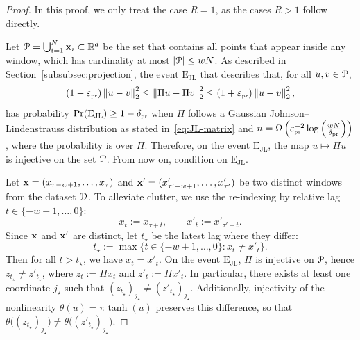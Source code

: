 \begin{proof}
    In this proof, we only treat the case $R = 1$, as the cases $R > 1$ follow directly.
    
    Let ${\mathcal{P}} = \bigcup_{i=1}^N {\mathbf{x}}_i \subset {\mathbb{R}}^d$ be the set that contains all points that appear inside any window, which has cardinality at most $|{\mathcal{P}}| \leq wN$. As described in Section~\ref{subsubsec:projection}, the event $\mathrm{E_{JL}}$ that describes that, for all $u, v \in {\mathcal{P}}$,
    \begin{equation*}
        (1-\varepsilon_{\scriptscriptstyle \operatorname{pr}}) \left\lVert u - v\right\rVert_{2}^2 \leq \left\lVert\Pi u - \Pi v\right\rVert_{2}^2 \leq (1+\varepsilon_{\scriptscriptstyle \operatorname{pr}}) \left\lVert u - v\right\rVert_{2}^2,
    \end{equation*}
    has probability $\Pr(\mathrm{E_{JL}}) \geq 1- \delta_{\scriptscriptstyle \operatorname{pr}}$ when $\Pi$ follows a Gaussian Johnson--Lindenstrauss distribution as stated in~\cref{eq:JL-matrix} and $n = \Omega\left(\varepsilon_{\scriptscriptstyle \operatorname{pr}}^{-2} \log\left(\tfrac{w N}{\delta_{\scriptscriptstyle \operatorname{pr}}}\right)\right)$, where the probability is over $\Pi$.
    Therefore, on the event $\mathrm{E_{JL}}$, the map $u \mapsto \Pi u$ is injective on the set ${\mathcal{P}}$. From now on, condition on $\mathrm{E_{JL}}$.

    Let ${\mathbf{x}} = (x_{\tau - w + 1}, \ldots, x_\tau)$ and ${\mathbf{x}}' = (x'_{\tau' - w + 1}, \ldots, x'_{\tau'})$ be two distinct windows from the dataset ${\mathcal{D}}$. To alleviate clutter, we use the re-indexing by relative lag $t \in \{-w+1, \ldots, 0\}$:
    \[
        x_t := x_{\tau + t}, \qquad x'_t := x'_{\tau' + t}.
    \]
    Since ${\mathbf{x}}$ and ${\mathbf{x}}'$ are distinct, let $t_\star$ be the latest lag where they differ:
    \begin{equation*}
        t_\star := \max\{t\in\{-w+1,\ldots,0\}: x_t \neq x'_t\}.
    \end{equation*}
    Then for all $t>t_\star$, we have $x_t=x'_t$. On the event $\mathrm{E_{JL}}$, $\Pi$ is injective on ${\mathcal{P}}$, hence $z_{t_\star}\neq z'_{t_\star}$, where $z_t:=\Pi x_t$ and $z'_t:=\Pi x'_t$. In particular, there exists at least one coordinate $j_\star$ such that $(z_{t_\star})_{j_\star} \neq (z'_{t_\star})_{j_\star}$. Additionally, injectivity of the nonlinearity $\theta(u) = \pi \tanh(u)$ preserves this difference, so that $\theta\big((z_{t_\star})_{j_\star}\big) \neq \theta\big((z'_{t_\star})_{j_\star}\big)$.
    

\end{proof}
